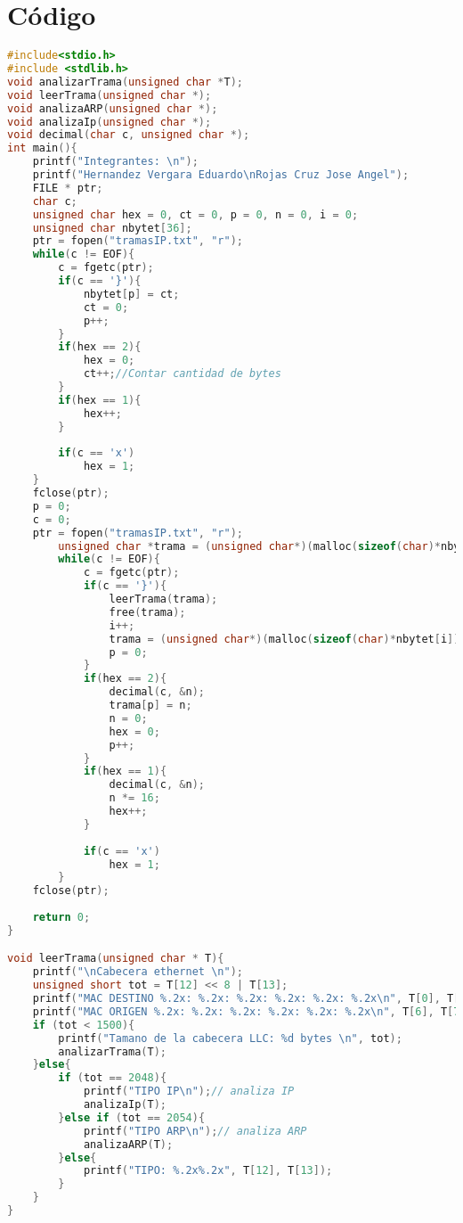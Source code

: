 \section{C\'odigo}
	\begin{lstlisting}[language={C}, caption={Analizador de tramas en C}, label={Script}]
#include<stdio.h>
#include <stdlib.h>
void analizarTrama(unsigned char *T);
void leerTrama(unsigned char *);
void analizaARP(unsigned char *);
void analizaIp(unsigned char *);
void decimal(char c, unsigned char *);
int main(){
	printf("Integrantes: \n");
	printf("Hernandez Vergara Eduardo\nRojas Cruz Jose Angel");
    FILE * ptr;
    char c;
	unsigned char hex = 0, ct = 0, p = 0, n = 0, i = 0;
	unsigned char nbytet[36];
	ptr = fopen("tramasIP.txt", "r");
    while(c != EOF){
		c = fgetc(ptr);
		if(c == '}'){
			nbytet[p] = ct;
			ct = 0;
			p++;
		}
		if(hex == 2){
			hex = 0;
			ct++;//Contar cantidad de bytes
		}
		if(hex == 1){
			hex++;
		}
			
		if(c == 'x')
			hex = 1;
	}
	fclose(ptr);
	p = 0;
	c = 0;
	ptr = fopen("tramasIP.txt", "r");
		unsigned char *trama = (unsigned char*)(malloc(sizeof(char)*nbytet[0]));
		while(c != EOF){
			c = fgetc(ptr);
			if(c == '}'){
                leerTrama(trama);
                free(trama);
                i++;
                trama = (unsigned char*)(malloc(sizeof(char)*nbytet[i]));
				p = 0;
			}	
			if(hex == 2){
				decimal(c, &n);
				trama[p] = n;
				n = 0;
				hex = 0;
				p++;
			}
			if(hex == 1){
				decimal(c, &n);
				n *= 16;
				hex++;
			}
				
			if(c == 'x')
				hex = 1;
		}
	fclose(ptr);
    
    return 0;
}

void leerTrama(unsigned char * T){
    printf("\nCabecera ethernet \n");
    unsigned short tot = T[12] << 8 | T[13];
    printf("MAC DESTINO %.2x: %.2x: %.2x: %.2x: %.2x: %.2x\n", T[0], T[1], T[2], T[3], T[4], T[5]);
    printf("MAC ORIGEN %.2x: %.2x: %.2x: %.2x: %.2x: %.2x\n", T[6], T[7], T[8], T[9], T[10], T[11]);
    if (tot < 1500){
        printf("Tamano de la cabecera LLC: %d bytes \n", tot);
        analizarTrama(T);
    }else{
        if (tot == 2048){
            printf("TIPO IP\n");// analiza IP
            analizaIp(T);
        }else if (tot == 2054){
            printf("TIPO ARP\n");// analiza ARP
            analizaARP(T);
        }else{
            printf("TIPO: %.2x%.2x", T[12], T[13]);
        }
    }
}


\end{lstlisting}
